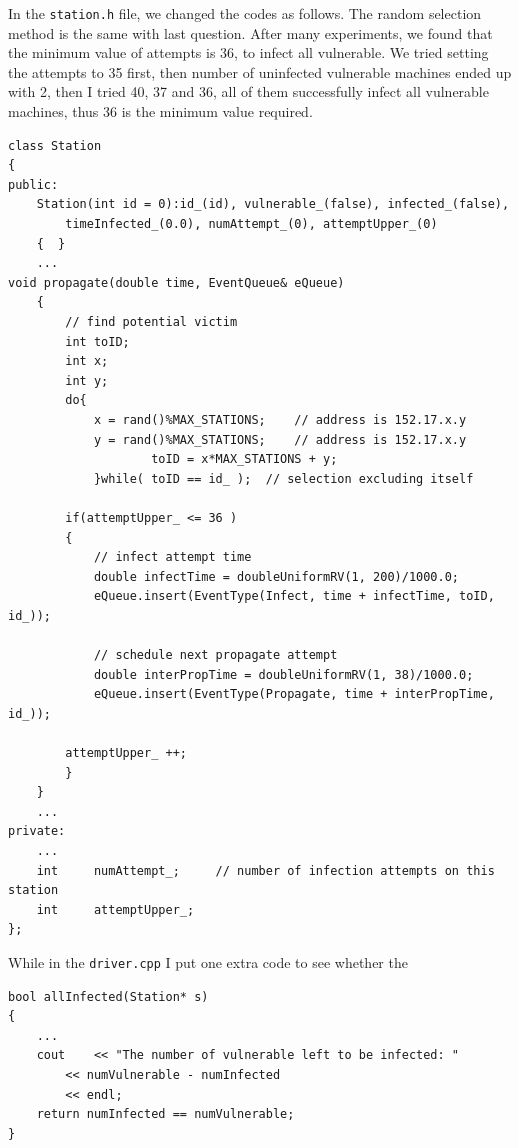 \documentclass[10pt]{article}
\begin{document}
In the \texttt{station.h} file, we changed the codes as follows. The random selection method is the same with last question. After many experiments, we found that the minimum value of attempts is 36, to infect all vulnerable. We tried setting the attempts to 35 first, then number of uninfected vulnerable machines ended up with 2, then I tried 40, 37 and 36, all of them successfully infect all vulnerable machines, thus 36 is the minimum value required.
\begin{lstlisting}
class Station
{
public:
	Station(int id = 0):id_(id), vulnerable_(false), infected_(false),
		timeInfected_(0.0), numAttempt_(0), attemptUpper_(0)
	{  }
    ...
void propagate(double time, EventQueue& eQueue)
	{
		// find potential victim
		int toID;
		int x;
		int y;
		do{
			x = rand()%MAX_STATIONS;  	// address is 152.17.x.y
			y = rand()%MAX_STATIONS;  	// address is 152.17.x.y
            		toID = x*MAX_STATIONS + y;
			}while( toID == id_ );	// selection excluding itself

		if(attemptUpper_ <= 36 )
		{	
			// infect attempt time
			double infectTime = doubleUniformRV(1, 200)/1000.0;
			eQueue.insert(EventType(Infect, time + infectTime, toID, id_));

			// schedule next propagate attempt
			double interPropTime = doubleUniformRV(1, 38)/1000.0;
			eQueue.insert(EventType(Propagate, time + interPropTime, id_));
		
		attemptUpper_ ++;	
		}
    }
    ...
private:
    ...
	int     numAttempt_;     // number of infection attempts on this station
	int 	attemptUpper_;
};
\end{lstlisting}
While in the \texttt{driver.cpp} I put one extra code to see whether the
\begin{lstlisting}
bool allInfected(Station* s)
{
    ...  		
	cout 	<< "The number of vulnerable left to be infected: "
		<< numVulnerable - numInfected
		<< endl;
	return numInfected == numVulnerable;
}
\end{lstlisting}
\end{document}
